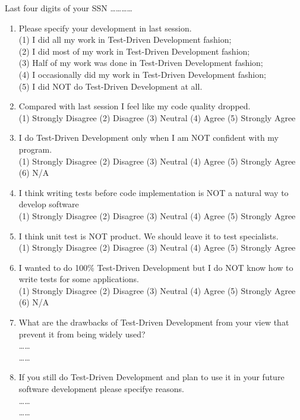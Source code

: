 \begin{center}
Last four digits of your SSN \dots\ldots\ldots\ldots
\end{center}

\begin{enumerate}
\item Please specify your development in last session. \\
(1) I did all my work in Test-Driven Development fashion; \\
(2) I did most of my work in Test-Driven Development fashion; \\
(3) Half of my work was done in Test-Driven Development fashion; \\
(4) I occasionally did my work in Test-Driven Development fashion; \\
(5) I did NOT do Test-Driven Development at all. 

\item Compared with last session I feel like my code quality dropped. \\
(1) Strongly Disagree (2) Disagree (3) Neutral (4) Agree (5) Strongly Agree

\item I do Test-Driven Development only when I am NOT confident with my program. \\
  (1) Strongly Disagree (2) Disagree (3) Neutral (4) Agree (5) Strongly
  Agree (6) N/A
  
\item I think writing tests before code implementation is NOT a natural way to 
develop software  \\
  (1) Strongly Disagree (2) Disagree (3) Neutral (4) Agree (5) Strongly
  Agree

\item I think unit test is NOT product. We should leave it to test specialists.  \\
(1) Strongly Disagree (2) Disagree (3) Neutral (4) Agree (5) Strongly Agree

\item I wanted to do 100\% Test-Driven Development but I do NOT know how to 
write tests for some applications. \\
(1) Strongly Disagree (2) Disagree (3) Neutral (4) Agree (5) Strongly Agree
(6) N/A

\item What are the drawbacks of Test-Driven Development from your view 
that prevent it from being widely used? \\
\ldots\dotfill\ldots \\
\ldots\dotfill\ldots

\item If you still do Test-Driven Development and plan to use it in
your future software development please specifye reasons.\\
\ldots\dotfill\ldots \\
\ldots\dotfill\ldots

\end{enumerate}








